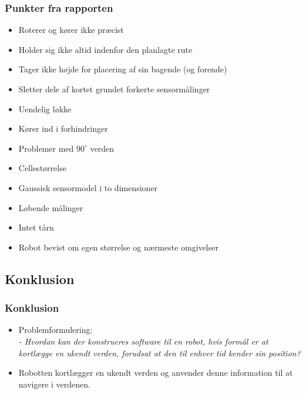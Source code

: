 \begin{frame}
\frametitle{Punkter fra rapporten}
\begin{itemize}
\item Roterer og kører ikke præcist
\item Holder sig ikke altid indenfor den planlagte rute
\item Tager ikke højde for placering af sin bagende (og forende)
\item Sletter dele af kortet grundet forkerte sensormålinger
\item Uendelig løkke
\item Kører ind i forhindringer
\item Problemer med $90^\circ$ verden
\item Cellestørrelse
\item Gaussisk sensormodel i to dimensioner
\item Løbende målinger
\item Intet tårn
\item Robot bevist om egen størrelse og nærmeste omgivelser
\end{itemize}
\end{frame}


\subsection{Konklusion}

\begin{frame}
\frametitle{Konklusion}
\begin{itemize}
\item Problemformulering:\\
\textit{- Hvordan kan der konstrueres software til en robot, hvis formål er at kortlægge en ukendt verden, forudsat at den til enhver tid kender sin position?}
\pause
\item Robotten kortlægger en ukendt verden og anvender denne information til at navigere i verdenen.
\end{itemize}
\end{frame}